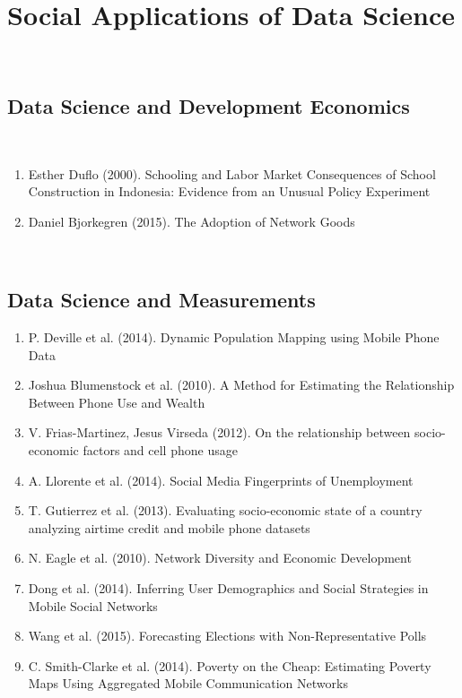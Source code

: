 \section{Social Applications of Data Science}
\\
\subsection{Data Science and Development Economics}  \\  
\begin{enumerate}  
\item  Esther Duflo (2000).  Schooling and Labor Market Consequences of School Construction in Indonesia: Evidence from an Unusual Policy Experiment \cite{Duflo_2000} 
\item Daniel Bjorkegren (2015).  The Adoption of Network Goods \cite{Bjorkegren} 
\end{enumerate}  
\\  
\subsection{Data Science and Measurements}  
\begin{enumerate}  
\item  P. Deville et al. (2014).  Dynamic Population Mapping using Mobile Phone Data\cite{Deville_2014} 
\item  Joshua Blumenstock et al. (2010).  A Method for Estimating the Relationship Between Phone Use and Wealth\cite{blumenstock2010method}  
\item  V. Frias-Martinez, Jesus Virseda (2012).  On the relationship between socio-economic factors and cell phone usage \cite{Frias_Martinez_2012} 
\item A. Llorente et al. (2014).  Social Media Fingerprints of Unemployment\cite{Llorente_2015}  
\item T. Gutierrez et al. (2013).  Evaluating socio-economic state of a country analyzing airtime credit and mobile phone datasets\cite{gutierrez2013evaluating}  
\item N. Eagle et al. (2010).  Network Diversity and Economic Development\cite{eagle2010network}   
\item Dong et al. (2014).  Inferring User Demographics and Social Strategies in Mobile Social Networks \cite{Dong:2014:IUD:2623330.2623703} 
\item Wang et al. (2015).  Forecasting Elections with Non-Representative Polls\cite{Wang2015980} 
\item C. Smith-Clarke et al. (2014).  Poverty on the Cheap: Estimating Poverty Maps Using Aggregated Mobile Communication Networks\cite{Smith-Clarke:2014:PCE:2556288.2557358} 
\end{enumerate}  
\\
